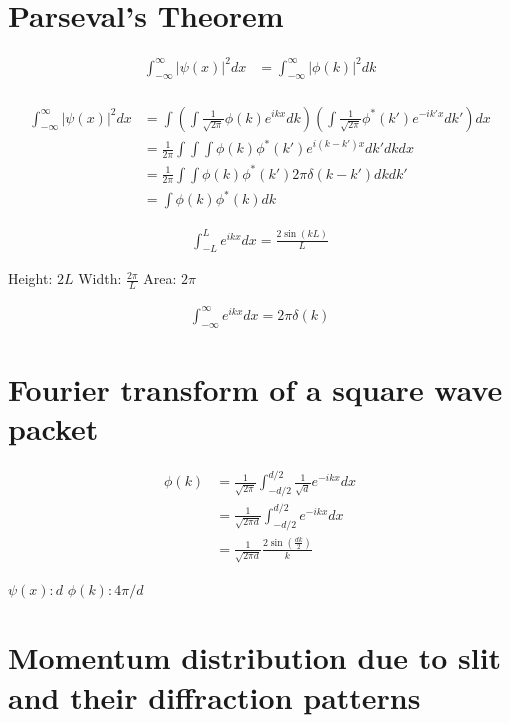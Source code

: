 \documentclass{article}
\title{}
\date{}
\newcommand{\<}{\langle}
\renewcommand{\>}{\rangle}
\begin{document}
\maketitle

\section{Parseval's Theorem}

\begin{align*}
\int_{-\infty}^{\infty} |\psi(x)|^2 dx &= \int_{-\infty}^{\infty} |\phi(k)|^2 dk \\
\end{align*}

\begin{align*}
\int_{-\infty}^{\infty} |\psi(x)|^2 dx &= \int \left(\int \frac{1}{\sqrt{2\pi}} \phi(k) e^{ikx} dk \right) \left( \int \frac{1}{\sqrt{2\pi}}\phi^*(k') e^{-ik'x} dk' \right) dx \\
&= \frac{1}{2\pi} \int\int\int \phi(k) \phi^*(k') e^{i(k-k')x} dk' dk dx \\
&= \frac{1}{2\pi} \int\int \phi(k) \phi^*(k') 2\pi\delta(k-k') dk dk' \\
&= \int \phi(k) \phi^*(k) dk
\end{align*}

\begin{align*}
\int_{-L}^L e^{ikx} dx = \frac{2\sin(kL)}{L}
\end{align*}

Height: $2L$
Width: $\frac{2\pi}{L}$
Area: $2\pi$

\begin{align*}
\int_{-\infty}^\infty e^{ikx} dx = 2\pi\delta(k)
\end{align*}

\section{Fourier transform of a square wave packet}

\begin{align*}
\phi(k) &= \frac{1}{\sqrt{2\pi}} \int_{-d/2}^{d/2} \frac{1}{\sqrt d} e^{-ikx} dx \\
&= \frac{1}{\sqrt{2\pi d}} \int_{-d/2}^{d/2} e^{-ikx} dx \\
&= \frac{1}{\sqrt{2\pi d}} \frac{2\sin(\frac{dk}{2})}{k}
\end{align*}

$\psi(x): d$
$\phi(k): 4\pi/d$

\section{Momentum distribution due to slit and their diffraction patterns}
\end{document}

